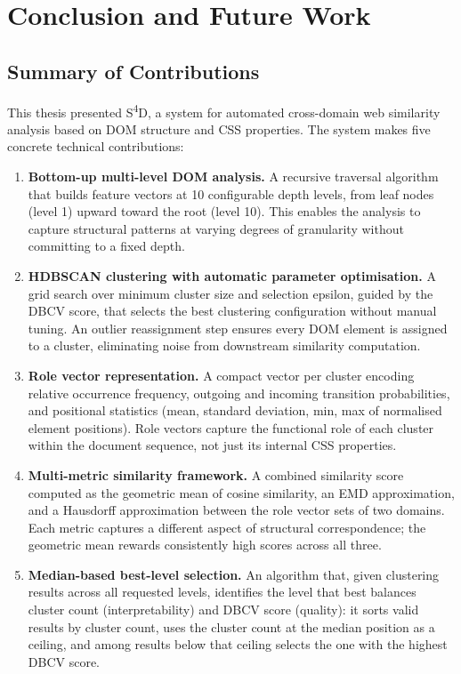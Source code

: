 \chapter{Conclusion and Future Work}
\label{ch:conclusion}

\section{Summary of Contributions}
\label{sec:contributions}

This thesis presented S\textsuperscript{4}D, a system for automated cross-domain web similarity analysis based on DOM structure and CSS properties. The system makes five concrete technical contributions:

\begin{enumerate}
    \item \textbf{Bottom-up multi-level DOM analysis.} A recursive traversal algorithm that builds feature vectors at 10 configurable depth levels, from leaf nodes (level 1) upward toward the root (level 10). This enables the analysis to capture structural patterns at varying degrees of granularity without committing to a fixed depth.

    \item \textbf{HDBSCAN clustering with automatic parameter optimisation.} A grid search over minimum cluster size and selection epsilon, guided by the DBCV score, that selects the best clustering configuration without manual tuning. An outlier reassignment step ensures every DOM element is assigned to a cluster, eliminating noise from downstream similarity computation.

    \item \textbf{Role vector representation.} A compact vector per cluster encoding relative occurrence frequency, outgoing and incoming transition probabilities, and positional statistics (mean, standard deviation, min, max of normalised element positions). Role vectors capture the functional role of each cluster within the document sequence, not just its internal CSS properties.

    \item \textbf{Multi-metric similarity framework.} A combined similarity score computed as the geometric mean of cosine similarity, an EMD approximation, and a Hausdorff approximation between the role vector sets of two domains. Each metric captures a different aspect of structural correspondence; the geometric mean rewards consistently high scores across all three.

    \item \textbf{Median-based best-level selection.} An algorithm that, given clustering results across all requested levels, identifies the level that best balances cluster count (interpretability) and DBCV score (quality): it sorts valid results by cluster count, uses the cluster count at the median position as a ceiling, and among results below that ceiling selects the one with the highest DBCV score.
\end{enumerate}

